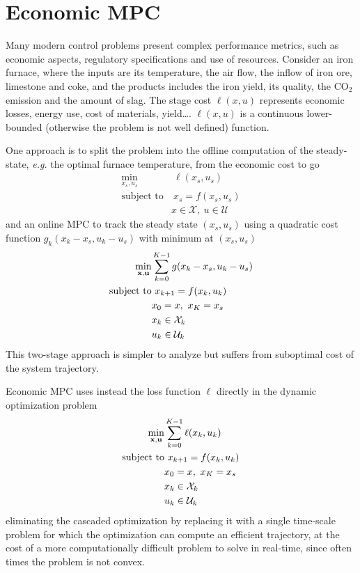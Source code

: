 \chapter{Economic MPC}
\label{chap:economic-mpc}

Many modern control problems present complex performance metrics, such as economic aspects, regulatory specifications and use of resources. Consider an iron furnace, where the inputs are its temperature, the air flow, the inflow of iron ore, limestone and coke, and the products includes the iron yield, its quality, the CO$_2$ emission and the amount of slag. The stage cost $\ell(x,u)$ represents economic losses, energy use, cost of materials, yield\ldots. $\ell(x,u)$ is a continuous lower-bounded (otherwise the problem is not well defined) function.

One approach is to split the problem into the offline computation of the steady-state, \textit{e.g.} the optimal furnace temperature, from the economic cost to go
\begin{align*}
  \min_{x_s,u_s} &\ \ell(x_s,u_s) \\
  \text{subject to} &\ x_s = f(x_s,u_s) \\
                 & x\in \mathcal{X},\ u\in \mathcal{U}
\end{align*}
and an online MPC to track the steady state $(x_s,u_s)$ using a quadratic cost function $g_k(x_k-x_s,u_k-u_s)$ with minimum at $(x_s,u_s)$
\begin{align*}
  \min_{\boldsymbol{\mathrm{x}},\boldsymbol{\mathrm{u}}} & \sum_{k=0}^{K-1} g(x_k-x_s,u_k-u_s) \\
  \text{subject to} &\ x_{k+1} = f(x_k,u_k) \\
                   & x_0 = x,\ x_K=x_s \\
                   & x_k\in \mathcal{X}_k\\
                   & u_k\in \mathcal{U}_k
\end{align*}
This two-stage approach is simpler to analyze but suffers from suboptimal cost of the system trajectory.

Economic MPC uses instead the loss function $\ell$ directly in the dynamic optimization problem
\begin{align*}
  \min_{\boldsymbol{\mathrm{x}},\boldsymbol{\mathrm{u}}} & \sum_{k=0}^{K-1} \ell(x_k,u_k) \\
  \text{subject to} &\ x_{k+1} = f(x_k,u_k) \\
                   & x_0 = x,\ x_K=x_s \\
                   & x_k\in \mathcal{X}_k \\
                   & u_k\in \mathcal{U}_k
\end{align*}
eliminating the cascaded optimization by replacing it with a single time-scale problem for which the optimization can compute an efficient trajectory, at the cost of a more computationally difficult problem to solve in real-time, since often times the problem is not convex.

